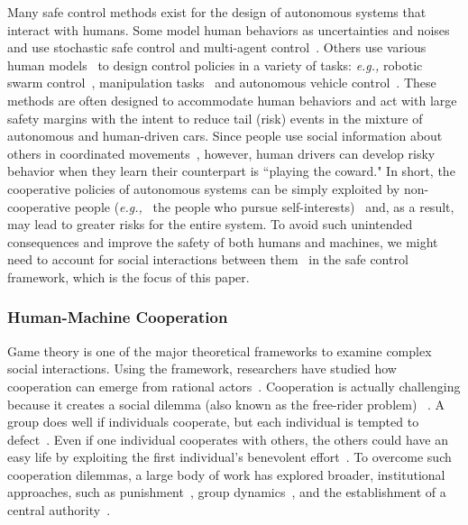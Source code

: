 \documentclass[letterpaper]{article} %
\newcommand{\eg}{\textit{e.g., }}
\begin{document}
Many safe control methods exist for the design of autonomous systems that interact with humans. Some model human behaviors as uncertainties and noises and use stochastic safe control and multi-agent control~\cite{ahmadi2019safe,luo2020multi,lyu2021probabilistic,cheng2020safe}. Others use various human models~\cite{kulic2007affective,ding2011human,kelley2008understanding,ravichandar2018gaze,koppula2015anticipating} to design control policies in a variety of tasks: \eg robotic swarm control~\cite{atman2018motion,diaz2017human}, manipulation tasks~\cite{erhart2016model,peng2018collaborative} and autonomous vehicle control~\cite{cummings2011impact}. These methods are often designed to accommodate human behaviors and act with large safety margins with the intent to reduce tail (risk) events in the mixture of autonomous and human-driven cars. Since people use social information about others in coordinated movements~\cite{Faria2010-uq}, however, human drivers can develop risky behavior when they learn their counterpart is ``playing the coward." In short, the cooperative policies of autonomous systems can be simply exploited by non-cooperative people (\eg~the people who pursue self-interests)~\cite{Ishowo-Oloko2019-vn,Dawes1980-il,Shirado2020-hs} and, as a result, may lead to greater risks for the entire system. To avoid such unintended consequences and improve the safety of both humans and machines, we might need to account for social interactions between them~\cite{Chen2017-ns} in the safe control framework, which is the focus of this paper.

\subsubsection{Human-Machine Cooperation}

Game theory is one of the major theoretical frameworks to examine complex social interactions. Using the framework, researchers have studied how cooperation can emerge from rational actors~\cite{Axelrod1984-pg}. Cooperation is actually challenging because it creates a social dilemma (also known as the free-rider problem) ~\cite{Dawes1980-il}. A group does well if individuals cooperate, but each individual is tempted to defect~\cite{Olson1965-bc}. Even if one individual cooperates with others, the others could have an easy life by exploiting the first individual's benevolent effort~\cite{Nowak2006-bl}. To overcome such cooperation dilemmas, a large body of work has explored broader, institutional approaches, such as punishment~\cite{Fehr2002-ur}, group dynamics~\cite{Shirado2013-nl}, and the establishment of a central authority~\cite{Ostrom1990-wp}. 
\end{document}
